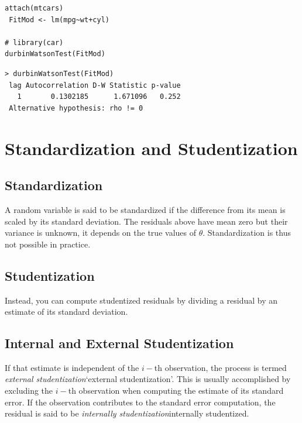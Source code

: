 \documentclass[12pt, a4paper]{article}
\theoremstyle{plain}
\theoremstyle{definition}
\theoremstyle{remark}
\begin{document}
\begin{framed}
\begin{verbatim}
attach(mtcars)
 FitMod <- lm(mpg~wt+cyl)

# library(car)
durbinWatsonTest(FitMod)

\end{verbatim}
\end{framed}
\begin{verbatim}
> durbinWatsonTest(FitMod)
 lag Autocorrelation D-W Statistic p-value
   1       0.1302185      1.671096   0.252
 Alternative hypothesis: rho != 0
\end{verbatim}
\newpage

\newpage
\section{Standardization and Studentization}
\subsection{Standardization} %

A random variable is said to be standardized if the difference from its mean is scaled by its standard deviation. The residuals above have mean zero but their variance is unknown, it depends on the true values of $\theta$. Standardization is thus not possible in practice.

\subsection{Studentization} %
Instead, you can compute studentized residuals by dividing a residual by an estimate of its standard deviation. 

\subsection{Internal and External Studentization} %
If that estimate is independent of the $i-$th observation, the process is termed \emph{external studentization}`external studentization'. This is usually accomplished by excluding the $i-$th observation when computing the estimate of its standard error. If the observation contributes to the
standard error computation, the residual is said to be \emph{internally studentization}internally studentized.
\end{document}
